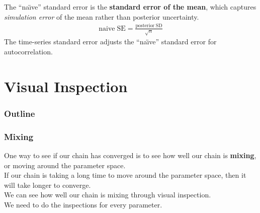 \documentclass{beamer}
\begin{document}
\begin{frame}
The ``na\"{\i}ve'' standard error is the \textbf{standard error of the mean},
which captures \textit{simulation error} of the mean rather than posterior
uncertainty.  
\pause
\begin{eqnarray*}
\mathrm{naive \; SE} = \frac{\mathrm{posterior \; SD}}{\sqrt{n}}
\end{eqnarray*}
\pause
The time-series standard error adjusts the ``na\"{\i}ve'' standard
error for autocorrelation.
\end{frame}


\section{Visual Inspection}

\begin{frame}
\frametitle{Outline}
\tableofcontents[currentsection]
\end{frame}

\begin{frame}
\frametitle{Mixing}
\pause
One way to see if our chain has converged is to see how well our chain
is \textbf{mixing}, or moving around the parameter space.\\
\pause
\bigskip
If our chain is taking a long time to move around the parameter space,
then it will take longer to converge.  \\
\pause
\bigskip
We can see how well our chain is mixing through visual inspection. \\
\pause
\bigskip
We need to do the inspections for every parameter.
\end{frame}
\end{document}

